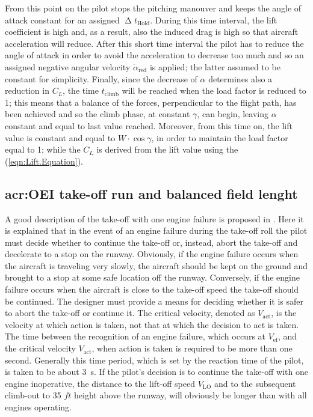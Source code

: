 \bigskip
\noindent
From this point on the pilot stops the pitching manouver and keeps the angle of attack constant for an assigned $\upDelta t_{\text{Hold}}$. During this time interval, the lift coefficient is high and, as a result, also the induced drag is high so that aircraft acceleration will reduce. 
%
After this short time interval the pilot has to reduce the angle of attack in order to avoid the acceleration to decrease too much and so an assigned negative angular velocity $\dot\alpha_{\text{red}}$ is applied; the latter assumed to be constant for simplicity. 
%
Finally, since the decrease of $\alpha$ determines also a reduction in $C_L$, the time $t_{\text{climb}}$ will be reached when the load factor is reduced to 1; this means that a balance of the forces, perpendicular to the flight path, has been achieved and so the climb phase, at constant $\gamma$, can begin, leaving $\alpha$ constant and equal to last value reached. Moreover, from this time on, the lift value is constant and equal to $W\cdot\cos\gamma$, in order to maintain the load factor equal to 1; while the $C_L$ is derived from the lift value using the (\ref{eqn:Lift.Equation}).
%
\subsection{\gls{acr:OEI} take-off run and balanced field lenght}
\label{subpar:OEI}
A good description of the take-off with one engine failure is proposed in \cite{sforza2014commercial}. Here it is explained that in the event of an engine failure during the take-off roll the pilot must decide whether to continue the take-off or, instead, abort the take-off and decelerate to a stop on the runway. Obviously, if the engine failure occurs when the aircraft is traveling very slowly, the aircraft should be kept on the ground and brought to a stop at some safe location off the runway. Conversely, if the engine failure occurs when the aircraft is close to the take-off speed the take-off should be continued. The designer must provide a means for deciding whether it is safer to abort the take-off or continue it.
%
The critical velocity, denoted as $V_{\text{act}}$, is the velocity at which action is taken, not that at which the decision to act is taken. The time between the recognition of an engine failure, which occurs at $V_{\text{ef}}$, and the critical velocity $V_{\text{act}}$, when action is taken is required to be more than one second. Generally this time period, which is set by the reaction time of the pilot, is taken to be about \SI{3}{\second}. If the pilot’s decision is to continue the take-off with one engine inoperative, the distance to the lift-off speed $V_{\text{LO}}$ and to the subsequent climb-out to 35 $\si{ft}$ height above the runway, will obviously be longer than with all engines operating.

